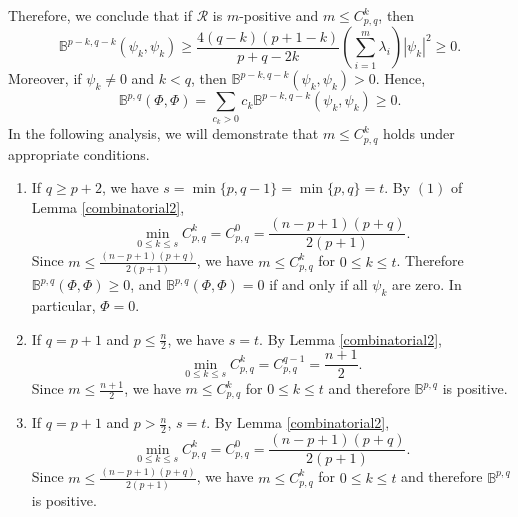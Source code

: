 \documentclass[12pt, reqno]{amsart}
\theoremstyle{plain}
\theoremstyle{definition}
\newcommand{\beq}{\begin{equation}}
\newcommand{\eeq}{\end{equation}}
\newcommand{\bd}{\begin{enumerate}}
\newcommand{\ed}{\end{enumerate}}
\renewcommand{\>}{\rightarrow}
\renewcommand{\#}{\sharp}
\numberwithin{equation}{section} %
\begin{document}
\noindent 
 Therefore, we
conclude that if  $ \mathcal{R} $ is $ m
$-positive and $ m \leq C_{p,q}^k $, then \beq \label{PostivityB}
\mathbb{B}^{p-k,q-k}(\psi_k,\psi_k) \geq
\frac{4(q-k)(p+1-k)}{p+q-2k}\left(
\sum_{i=1}^m \lambda_i \right)|\psi_k|^2\geq 0. \eeq Moreover, if  $
\psi_k \neq 0 $ and $ k < q $, then $ \mathbb{B}^{p-k,q-k}(\psi_k,\psi_k) > 0 $. Hence, 
\beq\mathbb B^{p,q}(\Phi,\Phi)= \sum_{c_k>0} c_k \mathbb{B}^{p-k,q-k}(\psi_k,\psi_k)\geq 0.\eeq 
In the following analysis, we will demonstrate that $ m \leq C_{p,q}^k $ holds under appropriate conditions.\\

 \bd
\item If $ q \geq p + 2 $, we have $ s = \min\{p,q-1\} = \min\{p,q\} = t $. By $(1)$ of Lemma \ref{combinatorial2}, 
\beq \min_{0\leq k\leq s} C_{p,q}^k =C_{p,q}^0= \frac{(n-p+1)(p+q)}{2(p+1)}. \eeq
Since $ m \leq \frac{(n-p+1)(p+q)}{2(p+1)}$, we have $ m \leq C_{p,q}^k $ for $ 0 \leq k \leq t$.  Therefore $ \mathbb{B}^{p,q}(\Phi,\Phi)\geq 0 $,  and $\mathbb{B}^{p,q}(\Phi,\Phi)=0$ if and only if all $\psi_k$ are zero. In particular, $\Phi=0$.
\item If $ q = p + 1 $ and $ p \leq \frac{n}{2} $,  we have $ s = t $. By Lemma \ref{combinatorial2},
\beq \min_{0\leq k\leq s} C_{p,q}^k =C_{p,q}^{q-1}= \frac{n+1}{2}. \eeq
Since $ m \leq \frac{n+1}{2}$, we have $ m \leq C_{p,q}^k $ for $ 0 \leq k \leq t $ and therefore $ \mathbb{B}^{p,q} $ is positive.
\item If $ q = p + 1 $ and $ p > \frac{n}{2} $,  $ s = t $. By Lemma \ref{combinatorial2},
\beq \min_{0\leq k\leq s} C_{p,q}^k =C_{p,q}^0= \frac{(n-p+1)(p+q)}{2(p+1)}. \eeq
Since $ m \leq \frac{(n-p+1)(p+q)}{2(p+1)}$, we have $ m \leq C_{p,q}^k $ for $ 0 \leq k \leq t $ and therefore $ \mathbb{B}^{p,q} $ is positive.\ed 
\end{document}

